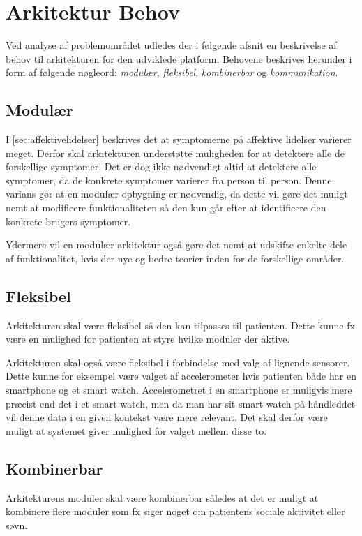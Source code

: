 \section{Arkitektur Behov}\label{arkitekturkrav}
Ved analyse af problemområdet udledes der i følgende afsnit en beskrivelse af behov til arkitekturen for den udviklede platform.
Behovene beskrives herunder i form af følgende nøgleord: \textit{modulær}, \textit{fleksibel}, \textit{kombinerbar} og \textit{kommunikation}.

\subsection{Modulær}\label{arkitekturkrav::modulaer}
I \cref{sec:affektivelidelser} beskrives det at symptomerne på affektive lidelser varierer meget.
Derfor skal arkitekturen understøtte muligheden for at detektere alle de forskellige symptomer.
Det er dog ikke nødvendigt altid at detektere alle symptomer, da de konkrete symptomer varierer fra person til person.
Denne varians gør at en modulær opbygning er nødvendig, da dette vil gøre det muligt nemt at modificere funktionaliteten så den kun går efter at identificere den konkrete brugers symptomer.

Ydermere vil en modulær arkitektur også gøre det nemt at udskifte enkelte dele af funktionalitet, hvis der nye og bedre teorier inden for de forskellige områder.

\subsection{Fleksibel}\label{arkitekturkrav::fleksibel}
Arkitekturen skal være fleksibel så den kan tilpasses til patienten.
Dette kunne fx være en mulighed for patienten at styre hvilke moduler der aktive.

Arkitekturen skal også være fleksibel i forbindelse med valg af lignende sensorer.
Dette kunne for eksempel være valget af accelerometer hvis patienten både har en smartphone og et smart watch.
Accelerometret i en smartphone er muligvis mere præcist end det i et smart watch, men da man har sit smart watch på håndleddet vil denne data i en given kontekst være mere relevant.
Det skal derfor være muligt at systemet giver mulighed for valget mellem disse to.

\subsection{Kombinerbar}\label{arkitekturkrav::kombinerbar}
Arkitekturens moduler skal være kombinerbar således at det er muligt at kombinere flere moduler som fx siger noget om patientens sociale aktivitet eller søvn.

